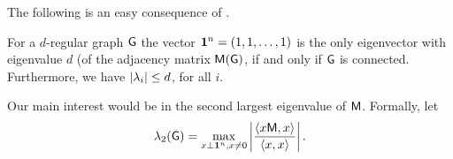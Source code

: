 The following is an easy consequence of .

\begin{lemma}
    For a $d$-regular graph $\mathsf{G}$ the vector $\OneVec{n} = \pth{1,
       1, \ldots, 1}$ is the only eigenvector with eigenvalue $d$ (of
    the adjacency matrix $\Mtrx\pth{\Graph}$, if and only if $\mathsf{G}$
    is connected. Furthermore, we have $\left| {\lambda_i} \right| \leq d$,
    for all $i$.
\end{lemma} 

\medskip

Our main interest would be in the second largest
eigenvalue of $\mathsf{M}$. Formally, let
\[
\lambda_2(\mathsf{G}) = \max_{x \bot \mathbf{1}^{n}, x \ne 0}
\left| {\frac{\left\langle {{x \mathsf{M}},{x}} \right\rangle}{\left\langle {{x},{x}} \right\rangle}} \right|.
\]


